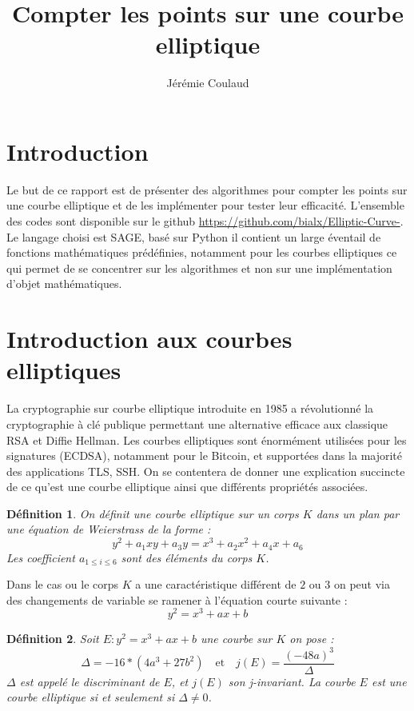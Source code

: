 \documentclass{article}
\title{Compter les points sur une courbe elliptique}
\author{Jérémie Coulaud}
\begin{document}
\newtheorem{prop}{Proposition}
\newtheorem{defi}{Définition}
\newtheorem{thm}{Théorème}
\maketitle
\newpage
\tableofcontents
\newpage

\section{Introduction}
Le but de ce rapport est de présenter des algorithmes pour compter les points sur une courbe elliptique et de les implémenter pour tester leur efficacité. L'ensemble des codes sont disponible sur le github \url{https://github.com/bialx/Elliptic-Curve-}. Le langage choisi est SAGE, basé sur Python il contient un large éventail de fonctions mathématiques prédéfinies, notamment pour les courbes elliptiques ce qui permet de se concentrer sur les algorithmes et non sur une implémentation d'objet mathématiques.
\section{Introduction aux courbes elliptiques}
La cryptographie sur courbe elliptique introduite en 1985 a révolutionné la cryptographie à clé publique permettant une alternative efficace aux classique RSA et Diffie Hellman. Les courbes elliptiques sont énormément utilisées pour les signatures (ECDSA), notamment pour le Bitcoin, et supportées dans la majorité des applications TLS, SSH. On se contentera de donner une explication succincte de ce qu'est une courbe elliptique ainsi que différents propriétés associées.

\begin{defi}
On définit une courbe elliptique sur un corps $K$ dans un plan par une équation de Weierstrass de la forme : 
\begin{equation*}
y^2 + a_1xy + a_3y  = x^3 + a_2x^2 + a_4x + a_6
\end{equation*}
Les coefficient $a_{1 \leq i \leq 6}$ sont des éléments du corps $K$.
\end{defi}

Dans le cas ou le corps $K$ a une caractéristique différent de $2$ ou $3$ on peut via des changements de variable se ramener à l'équation courte suivante : 
\begin{equation*}
y^2 = x^3 + ax +b
\end{equation*}

\begin{defi}
Soit $E : y^2 = x^3 + ax +b$ une courbe sur $K$ on pose : 
\begin{equation*}
\Delta = -16*(4a^3 + 27b^2) \quad \text{et} \quad j(E) = \frac{(-48a)^3}{\Delta}
\end{equation*}
$\Delta$ est appelé le discriminant de $E$, et $j(E)$ son j-invariant. La courbe $E$ est une courbe elliptique si et seulement si $\Delta \ne 0$.
\end{defi}
\end{document}
